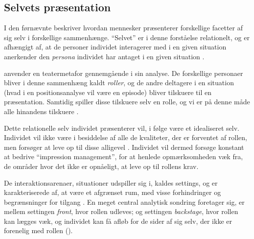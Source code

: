 \subsection{Selvets præsentation}

I den førnævnte  
beskriver \citeauthor{goffmanPresentationSelfEveryday1956} hvordan 
mennesker præsenterer forskellige facetter af sig selv i 
forskellige sammenhænge. “Selvet” er i denne forståelse 
relationelt, og er afhængigt af, at de personer individet 
interagerer med i en given situation anerkender den \emph{persona} 
individet har antaget i en given situation \autocite[s.  
???]{goffmanPresentationSelfEveryday1956}.

\citeauthor{goffmanPresentationSelfEveryday1956} anvender en 
teatermetafor gennemgående i sin analyse. De forskellige personaer 
bliver i denne sammenhæng kaldt \emph{roller}, og de andre 
deltagere i en situation (hvad i en positionsanalyse vil være en 
episode) bliver tilskuere til en præsentation. Samtidig spiller 
disse tilskuere selv en rolle, og vi er på denne måde alle 
hinandens tilskuere \autocite[s. 
???]{goffmanPresentationSelfEveryday1956}.

Dette relationelle selv individet præsenterer vil, i følge 
\citeauthor{goffmanPresentationSelfEveryday1956} være et 
idealiseret selv. Individet vil ikke være i besiddelse af alle de 
kvaliteter, der er forventet af rollen, men forsøger at leve op 
til disse alligevel \citeyear[s. 
???]{goffmanPresentationSelfEveryday1956}. Individet vil dermed 
forsøge konstant at bedrive “impression management”, for at 
henlede opmærksomheden væk fra, de områder hvor det ikke er 
opnåeligt, at leve op til rollens krav.

De interaktionsarenaer, situationer udspiller sig i, kaldes 
settings, og er karakteriserede af, at være et afgrænset rum, med 
visse forhindringer og begrænsninger for tilgang \autocite[s.  
???]{goffmanPresentationSelfEveryday1956}. En meget central 
analytisk sondring 
\citeauthor{goffmanPresentationSelfEveryday1956} foretager sig, er
mellem settingen \emph{front}, hvor rollen udleves; og settingen 
\emph{backstage}, hvor rollen kan lægges væk, og individet kan få 
afløb for de sider af sig selv, der ikke er forenelig med rollen 
(\citeyear[s. ???]{goffmanPresentationSelfEveryday1956}).

